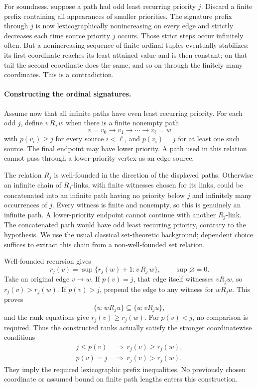 For soundness, suppose a
path had odd least recurring
priority \(j\).
Discard a finite prefix
containing all appearances
of smaller priorities.
The signature prefix through
\(j\) is now lexicographically
nonincreasing on every edge
and strictly decreases each
time source priority \(j\)
occurs. Those strict steps
occur infinitely often.
But a nonincreasing sequence
of finite ordinal tuples
eventually stabilizes:
its first coordinate reaches
its least attained value
and is then constant;
on that tail the second
coordinate does the same,
and so on through the
finitely many coordinates.
This is a contradiction.

\paragraph{Constructing the ordinal signatures.}
Assume now that all infinite
paths have even least
recurring priority.
For each odd \(j\), define
\(v\,R_j\,w\) when there
is a finite nonempty path
\[
 v=v_0\to v_1\to\cdots\to v_\ell=w
\]
with \(p(v_i)\geq j\)
for every source \(i<\ell\),
and \(p(v_i)=j\) for
at least one such source.
The final endpoint may
have lower priority.
A path used in this
relation cannot pass through
a lower-priority vertex
as an edge source.

The relation \(R_j\) is
well-founded in the direction
of the displayed paths.
Otherwise an infinite chain
of \(R_j\)-links, with
finite witnesses chosen for
its links, could be
concatenated into an infinite
path having no priority
below \(j\) and infinitely
many occurrences of \(j\).
Every witness is finite
and nonempty, so this
is genuinely an infinite
path. A lower-priority
endpoint cannot continue
with another \(R_j\)-link.
The concatenated path
would have odd least
recurring priority, contrary
to the hypothesis.
We use the usual classical
set-theoretic background;
dependent choice suffices
to extract this chain
from a non-well-founded
set relation.

Well-founded recursion gives
\[
 r_j(v)=\sup\{r_j(w)+1:v\,R_j\,w\},
 \qquad \sup\varnothing=0.
\]
Take an original edge
\(v\to w\).
If \(p(v)=j\), that edge
itself witnesses \(vR_jw\),
so \(r_j(v)>r_j(w)\).
If \(p(v)>j\), prepend
the edge to any witness
for \(wR_ju\).
This proves
\[
 \{u:wR_ju\}\subseteq\{u:vR_ju\},
\]
and the rank equations
give \(r_j(v)\geq r_j(w)\).
For \(p(v)<j\), no
comparison is required.
Thus the constructed ranks
actually satisfy the stronger
coordinatewise conditions
\[
\begin{aligned}
 j\leq p(v)&\ \Longrightarrow\
                         r_j(v)\geq r_j(w),\\
 p(v)=j&\ \Longrightarrow\
                         r_j(v)>r_j(w).
\end{aligned}
\]
They imply the required
lexicographic prefix inequalities.
No previously chosen coordinate
or assumed bound on finite
path lengths enters this
construction.

